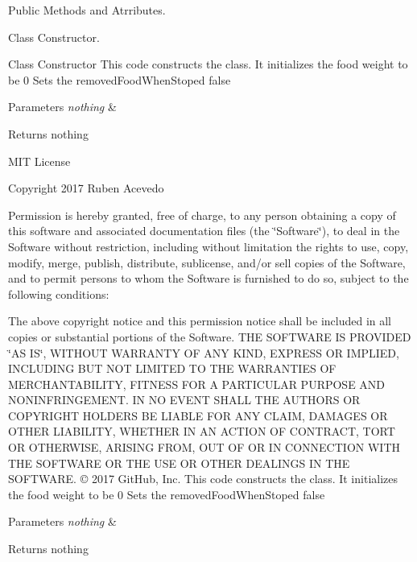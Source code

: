 Public Methods and Atrributes. 

Class Constructor.

Class Constructor This code constructs the class. It initializes the food weight to be 0 Sets the removed\+Food\+When\+Stoped false 
\begin{DoxyParams}{Parameters}
{\em nothing} & \\
\hline
\end{DoxyParams}
\begin{DoxyReturn}{Returns}
nothing
\end{DoxyReturn}
M\+IT License

Copyright 2017 Ruben Acevedo

Permission is hereby granted, free of charge, to any person obtaining a copy of this software and associated documentation files (the \char`\"{}\+Software\char`\"{}), to deal in the Software without restriction, including without limitation the rights to use, copy, modify, merge, publish, distribute, sublicense, and/or sell copies of the Software, and to permit persons to whom the Software is furnished to do so, subject to the following conditions\+:

The above copyright notice and this permission notice shall be included in all copies or substantial portions of the Software. T\+HE S\+O\+F\+T\+W\+A\+RE IS P\+R\+O\+V\+I\+D\+ED \char`\"{}\+A\+S I\+S\char`\"{}, W\+I\+T\+H\+O\+UT W\+A\+R\+R\+A\+N\+TY OF A\+NY K\+I\+ND, E\+X\+P\+R\+E\+SS OR I\+M\+P\+L\+I\+ED, I\+N\+C\+L\+U\+D\+I\+NG B\+UT N\+OT L\+I\+M\+I\+T\+ED TO T\+HE W\+A\+R\+R\+A\+N\+T\+I\+ES OF M\+E\+R\+C\+H\+A\+N\+T\+A\+B\+I\+L\+I\+TY, F\+I\+T\+N\+E\+SS F\+OR A P\+A\+R\+T\+I\+C\+U\+L\+AR P\+U\+R\+P\+O\+SE A\+ND N\+O\+N\+I\+N\+F\+R\+I\+N\+G\+E\+M\+E\+NT. IN NO E\+V\+E\+NT S\+H\+A\+LL T\+HE A\+U\+T\+H\+O\+RS OR C\+O\+P\+Y\+R\+I\+G\+HT H\+O\+L\+D\+E\+RS BE L\+I\+A\+B\+LE F\+OR A\+NY C\+L\+A\+IM, D\+A\+M\+A\+G\+ES OR O\+T\+H\+ER L\+I\+A\+B\+I\+L\+I\+TY, W\+H\+E\+T\+H\+ER IN AN A\+C\+T\+I\+ON OF C\+O\+N\+T\+R\+A\+CT, T\+O\+RT OR O\+T\+H\+E\+R\+W\+I\+SE, A\+R\+I\+S\+I\+NG F\+R\+OM, O\+UT OF OR IN C\+O\+N\+N\+E\+C\+T\+I\+ON W\+I\+TH T\+HE S\+O\+F\+T\+W\+A\+RE OR T\+HE U\+SE OR O\+T\+H\+ER D\+E\+A\+L\+I\+N\+GS IN T\+HE S\+O\+F\+T\+W\+A\+RE. © 2017 Git\+Hub, Inc. This code constructs the class. It initializes the food weight to be 0 Sets the removed\+Food\+When\+Stoped false 
\begin{DoxyParams}{Parameters}
{\em nothing} & \\
\hline
\end{DoxyParams}
\begin{DoxyReturn}{Returns}
nothing 
\end{DoxyReturn}


